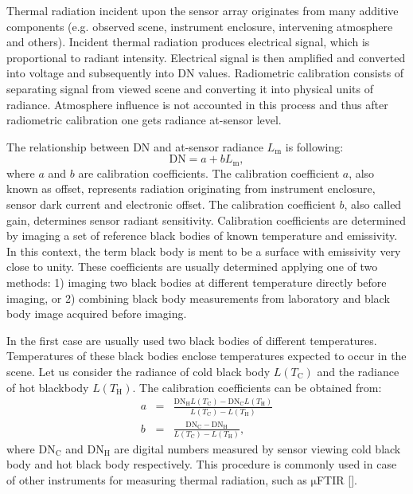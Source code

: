 Thermal radiation incident upon the sensor array originates from many additive components (e.g. observed scene, instrument enclosure, intervening atmosphere and others). Incident thermal radiation produces electrical signal, which is proportional to radiant intensity. Electrical signal is then amplified and converted into voltage and subsequently into DN values. Radiometric calibration consists of separating signal from viewed scene and converting it into physical units of radiance. Atmosphere influence is not accounted in this process and thus after radiometric calibration one gets radiance at-sensor level.

The relationship between DN and at-sensor radiance $L_\mathrm{m}$ is following:
$$ \mathrm{DN} = a + b L_\mathrm{m}, $$
where $a$ and $b$ are calibration coefficients. The calibration coefficient $a$, also known as offset, represents radiation originating from instrument enclosure, sensor dark current and electronic offset. The calibration coefficient $b$, also called gain, determines sensor radiant sensitivity. Calibration coefficients are determined by imaging a set of reference black bodies of known temperature and emissivity. In this context, the term black body is ment to be a surface with emissivity very close to unity. These coefficients are usually determined applying one of two methods: 1) imaging two black bodies at different temperature directly before imaging, or 2) combining black body measurements from laboratory and black body image acquired before imaging.

In the first case are usually used two black bodies of different temperatures. Temperatures of these black bodies enclose temperatures expected to occur in the scene. Let us consider the radiance of cold black body $L(T_\mathrm{C})$ and the radiance of hot blackbody $L(T_\mathrm{H})$. The calibration coefficients can be obtained from:
\begin{eqnarray*}
	a &=& \frac{\mathrm{DN}_\mathrm{H} L(T_\mathrm{C}) - \mathrm{DN}_\mathrm{C} L(T_\mathrm{H}) }{ L(T_\mathrm{C}) - L(T_\mathrm{H}) } \\
	b &=& \frac{\mathrm{DN}_\mathrm{C} - \mathrm{DN}_\mathrm{H}}{ L(T_\mathrm{C}) - L(T_\mathrm{H}) },
\end{eqnarray*}
where $\mathrm{DN}_\mathrm{C}$ and $\mathrm{DN}_\mathrm{H}$ are digital numbers measured by sensor viewing cold black body and hot black body respectively. This procedure is commonly used in case of other instruments for measuring thermal radiation, such as $\mathrm{\mu}$FTIR \ref{}.

